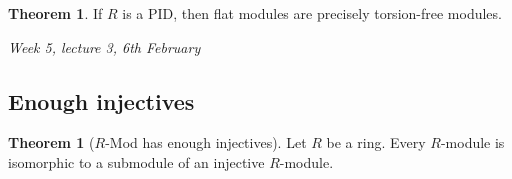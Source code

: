\documentclass{article}
\theoremstyle{definition}
\newtheorem{thm}[defn]{Theorem}
\begin{document}
\begin{thm}
\label{thm:flatistorsionfreeoverPID}
If $R$ is a PID, then flat modules are precisely torsion-free modules.
\end{thm}

\begin{flushright}
\textit{Week 5, lecture 3, 6th February}
\end{flushright}

\subsection{Enough injectives}
\begin{thm}[$R$-Mod has enough injectives]
\label{thm:enoughinjectives}
Let $R$ be a ring. Every $R$-module is isomorphic to a submodule of an injective $R$-module.
\end{thm}
\end{document}
